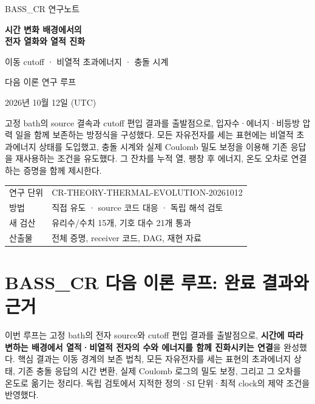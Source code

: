 \documentclass[11pt,a4paper]{article}
\begin{document}
\begin{titlepage}
{\color{MidnightBlue}\large BASS\_CR 연구노트\par}
\vspace{16mm}
{\Huge\bfseries 시간 변화 배경에서의\\[3mm]전자 열화와 열적 진화\par}
\vspace{8mm}
{\Large 이동 cutoff · 비열적 초과에너지 · 충돌 시계\par}
\vspace{12mm}
{\large 다음 이론 연구 루프\par}
\vspace{4mm}
{2026년 10월 12일 (UTC)\par}
\vspace{12mm}
\begin{minipage}{.96\textwidth}
\large
고정 bath의 source 결속과 cutoff 편입 결과를 출발점으로,
입자수·에너지·비등방 압력 일을 함께 보존하는 방정식을 구성했다.
모든 자유전자를 세는 표현에는 비열적 초과에너지 상태를 도입했고,
충돌 시계와 실제 Coulomb 밀도 보정을 이용해 기존 응답을 재사용하는 조건을 유도했다.
그 잔차를 누적 열, 팽창 후 에너지, 온도 오차로 연결하는 증명을 함께 제시한다.
\end{minipage}
\vfill
\begin{tabular}{@{}ll@{}}
연구 단위 & CR-THEORY-THERMAL-EVOLUTION-20261012\\
방법 & 직접 유도 · source 코드 대응 · 독립 해석 검토\\
새 검산 & 유리수/수치 15개, 기호 대수 21개 통과\\
산출물 & 전체 증명, receiver 코드, DAG, 재현 자료\\
\end{tabular}
\end{titlepage}
\tableofcontents
\clearpage
\hypertarget{bass_cr-uxb2e4uxc74c-uxc774uxb860-uxb8e8uxd504-uxc644uxb8cc-uxacb0uxacfcuxc640-uxadfcuxac70}{%
\section{BASS\_CR 다음 이론 루프: 완료 결과와 근거}\label{bass_cr-uxb2e4uxc74c-uxc774uxb860-uxb8e8uxd504-uxc644uxb8cc-uxacb0uxacfcuxc640-uxadfcuxac70}}

이번 루프는 고정 bath의 전자 source와 cutoff 편입 결과를 출발점으로, \textbf{시간에 따라 변하는 배경에서 열적·비열적 전자의 수와 에너지를 함께 진화시키는 연결}을 완성했다. 핵심 결과는 이동 경계의 보존 법칙, 모든 자유전자를 세는 표현의 초과에너지 상태, 기존 충돌 응답의 시간 변환, 실제 Coulomb 로그의 밀도 보정, 그리고 그 오차를 온도로 옮기는 정리다. 독립 검토에서 지적한 정의·SI 단위·최적 clock의 제약 조건을 반영했다.
\end{document}

